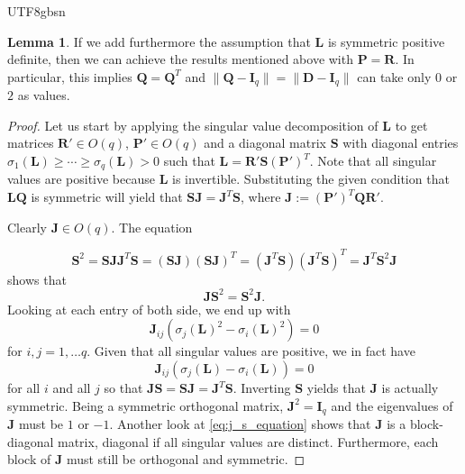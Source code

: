 \documentclass[12pt]{report}
\theoremstyle{plain}
\theoremstyle{definition}
\newtheorem{lemma}[theorem]{Lemma}
\begin{document}
\begin{CJK*}{UTF8}{gbsn}
\begin{lemma}
If we add furthermore the assumption that 
$\bm{L}$ is symmetric positive definite,
then we can achieve the results mentioned above with $\bm{P} = \bm{R}$.
In particular, this implies 
$\bm{Q} = \bm{Q}^T$ and $\|\bm{Q}-\bm{I}_q\| = \|\bm{D}-\bm{I}_q\|$
can take only $0$ or $2$ as values.
\end{lemma}

\begin{proof}
Let us start by applying the singular value decomposition 
of $\bm{L}$ to get matrices $\bm{R}'\in O(q)$, $\bm{P}' \in O(q)$
and a diagonal matrix $\bm{S}$ with diagonal entries 
$\sigma_1(\bm{L}) \geqslant \cdots \geqslant \sigma_q(\bm{L})>0$ 
such that $\bm{L} = \bm{R}'\bm{S}(\bm{P}')^T$.
Note that all singular values are positive because 
$\bm{L}$ is invertible.
Substituting the given condition that $\bm{L}\bm{Q}$ is symmetric will yield that
$\bm{S}\bm{J} = \bm{J}^T\bm{S}$, where $\bm{J} := (\bm{P}')^T \bm{Q} \bm{R}'$.

Clearly $\bm{J} \in O(q)$.
The equation 

\begin{equation*}
  \bm{S}^2 = \bm{S}\bm{J}\bm{J}^T\bm{S} = (\bm{S}\bm{J})(\bm{S}\bm{J})^T 
  = (\bm{J}^T\bm{S})(\bm{J}^T\bm{S})^T = \bm{J}^T\bm{S}^2\bm{J}
\end{equation*}
shows that 
\begin{equation*}
  \bm{J}\bm{S}^2=\bm{S}^2\bm{J}.
\end{equation*}
Looking at each entry of both side,
we end up with 
\begin{equation*}
  \bm{J}_{ij}(\sigma_j(\bm{L})^2-\sigma_i(\bm{L})^2) = 0
\end{equation*}
for $i,j = 1, \ldots q$.
Given that all singular values are positive,
we in fact have
\begin{equation}\label{eq:j_s_equation}
  \bm{J}_{ij}(\sigma_j(\bm{L})-\sigma_i(\bm{L})) = 0
\end{equation}
for all $i$ and all $j$ so that $\bm{J}\bm{S}=\bm{S}\bm{J}=\bm{J}^T\bm{S}$.
Inverting $\bm{S}$ yields that $\bm{J}$ is actually symmetric.
Being a symmetric orthogonal matrix, $\bm{J}^2 = \bm{I}_q$ and the eigenvalues of $\bm{J}$ 
must be $1$ or $-1$.
Another look at \eqref{eq:j_s_equation} shows that $\bm{J}$ is 
a block-diagonal matrix, diagonal if 
all singular values are distinct.
Furthermore, each block of $\bm{J}$ must still be orthogonal and symmetric.


\end{proof}
\end{CJK*}
\end{document}
